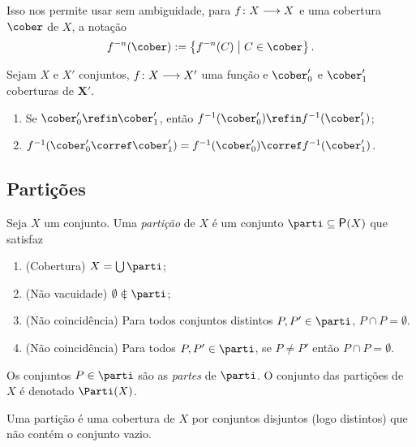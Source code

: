 Isso nos permite usar sem ambiguidade, para ${f}\colon {X} \longrightarrow {X}$ e uma cobertura $\cober$ de $X$, a notação
	\begin{equation*}
	f^{-n}(\cober) := \set{f^{-n}(C)}{C \in \cober}.
	\end{equation*}

\begin{exercise}
\label{prop:cobertura.puxada.refinamento.propriedades}
Sejam $X$ e $X'$ conjuntos, ${f}\colon {X} \longrightarrow {X'}$ uma função e $\cober'_0$ e $\cober'_1$ coberturas de $\bm X'$.
	\begin{enumerate}
	\item Se $\cober'_0 \refin \cober'_1$, então $f\inv(\cober'_0) \refin f\inv(\cober'_1)$;
	\item $f\inv(\cober'_0 \corref \cober'_1) = f\inv(\cober'_0) \corref f\inv(\cober'_1)$.
	\end{enumerate}
\end{exercise}




















\subsection{Partições}

\begin{definition}[Partição]
Seja $X$ um conjunto. Uma \emph{partição} de $X$ é um conjunto $\parti \subseteq \p(X)$ que satisfaz
	\begin{enumerate}
	\item (Cobertura) $X = \bigcup \parti$;
	\item (Não vacuidade) $\emptyset \notin \parti$;
	\item (Não coincidência) Para todos conjuntos distintos $P,P' \in \parti$, $P \cap P = \emptyset$.
	\item (Não coincidência) Para todos $P,P' \in \parti$, se $P \neq P'$ então $P \cap P = \emptyset$.
	\end{enumerate}
Os conjuntos $P \in \parti$ são as \emph{partes} de $\parti$. O conjunto das partições de $X$ é denotado $\Parti(X)$.
\end{definition}

Uma partição é uma cobertura de $X$ por conjuntos disjuntos (logo distintos) que não contém o conjunto vazio.

